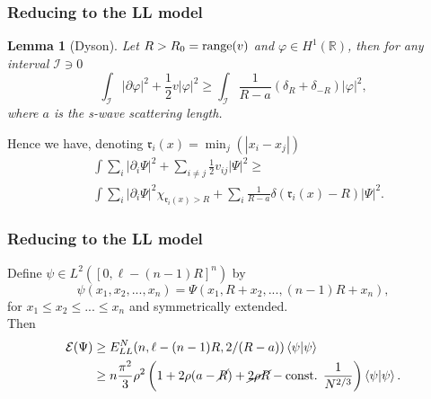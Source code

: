 \documentclass{beamer}[10]
\newcommand{\abs}[1]{\left\lvert #1 \right\rvert}
\renewcommand{\braket}[1]{\left\langle#1\right\rangle}
\newcommand{\R}{\mathbb{R}}
\newtheorem{mlemma}{Lemma}
\begin{document}
\begin{frame}
	\frametitle{Reducing to the LL model}
	\begin{block}{}
		\vspace{-0.5cm}
	\begin{mlemma}[Dyson]\label{LemmaDyson} Let $ R>R_0=\textnormal{range}(v) $ and $ \varphi\in H^1(\R) $, then for any interval $ \mathcal{I}\ni 0 $ 
		\begin{equation}
		\int_{\mathcal{I}} \abs{\partial \varphi}^2+\frac12 v\abs{\varphi}^2\geq \int_{\mathcal{I}}\frac{1}{R-a}\left(\delta_R+\delta_{-R}\right)\abs{\varphi}^2,
		\end{equation}
		where $ a $ is the s-wave scattering length.
	\end{mlemma}
	Hence we have, denoting $ \mathfrak{r}_{i}(x)=\min_j(\abs{x_i-x_j}) $ \begin{equation}
	\begin{aligned}
	&\int \sum_{i}\abs{\partial_i\Psi}^2+\sum_{i\neq j} \frac{1}{2}v_{ij}\abs{\Psi}^2\geq\\ &\int\sum_{i}\abs{\partial_i\Psi}^2\chi_{\mathfrak{r}_i(x)>R}+\sum_{i}\frac{1}{R-a}\delta(\mathfrak{r}_i(x)-R)\abs{\Psi}^2.
	\end{aligned}
	\end{equation}	
	\end{block}	
\end{frame}


\begin{frame}
	\frametitle{Reducing to the LL model}
	\begin{block}{}
		\vspace{-0.5cm}
		Define $ \psi\in L^2([0,\ell-(n-1)R]^n) $ by 
			$$ \psi(x_1,x_2,...,x_n)=\Psi(x_1,R+x_2,...,(n-1)R+x_n), $$
			 for $ x_1\leq x_2\leq...\leq x_n $ and symmetrically extended.\\\vspace{0.2cm}
			 Then \begin{equation}
			 \begin{aligned}
			 \mathcal{E}(\Psi)&\geq E^N_{LL}(n,\ell-(n-1)R,2/(R-a))\braket{\psi|\psi}\\
			 &\geq n\frac{\pi^2}{3}\rho^2\left(1+2\rho(a-\cancel{R})+\cancel{2\rho R}-\text{const. }\frac{1}{N^{2/3}}\right)\braket{\psi|\psi}.
			 \end{aligned}
			 \end{equation}
	\end{block}	
\end{frame}
\end{document}
